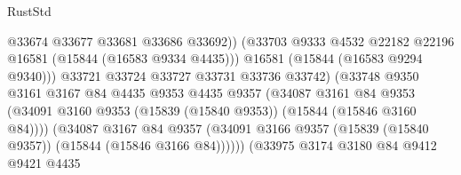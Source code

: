 \begin{lexlean}{RustStd}
\begin{coremodule}
                                            @33674
                                            @33677
                                            @33681
                                            @33686
                                            @33692))
                                        (@33703
                                          @9333
                                          @4532
                                          @22182
                                          @22196
                                          @16581
                                          (@15844 (@16583 @9334 @4435)))
                                        @16581
                                        (@15844 (@16583 @9294 @9340)))
                                      @33721
                                      @33724
                                      @33727
                                      @33731
                                      @33736
                                      @33742)
                                    (@33748
                                      @9350
                                      @3161
                                      @3167
                                      @84
                                      @4435
                                      @9353
                                      @4435
                                      @9357
                                      (@34087
                                        @3161
                                        @84
                                        @9353
                                        (@34091
                                          @3160
                                          @9353
                                          (@15839 (@15840 @9353))
                                          (@15844 (@15846 @3160 @84))))
                                      (@34087
                                        @3167
                                        @84
                                        @9357
                                        (@34091
                                          @3166
                                          @9357
                                          (@15839 (@15840 @9357))
                                          (@15844 (@15846 @3166 @84))))))
                                  (@33975
                                    @3174
                                    @3180
                                    @84
                                    @9412
                                    @9421
                                    @4435

\end{coremodule}
\end{lexlean}

